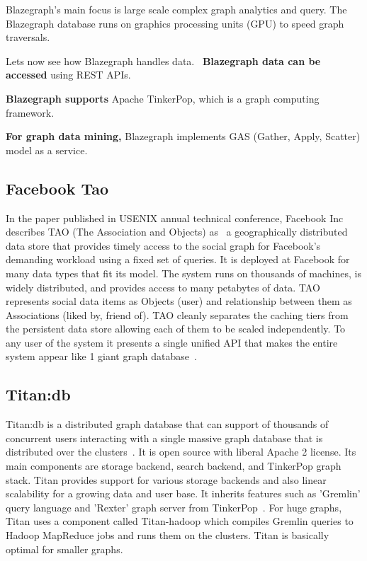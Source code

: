      Blazegraph's main focus is large scale complex graph analytics
     and query.  The Blazegraph database runs on graphics processing
     units (GPU) to speed graph traversals.~\cite{paper-blzgraph}

     Lets now see how Blazegraph handles data.~\cite{www-blzgraph} 
     {\bf Blazegraph data can be accessed} using REST APIs. 

     {\bf Blazegraph supports} Apache TinkerPop, which is a graph
      computing framework.

     {\bf For graph data mining,} Blazegraph implements GAS (Gather, Apply, 
     Scatter) model as a service.

     \pv

\subsection{Facebook Tao}

In the paper published in USENIX annual technical conference, Facebook
Inc describes TAO (The Association and Objects) as~\cite{book-tao} a
geographically distributed data store that provides timely access to
the social graph for Facebook's demanding workload using a fixed set
of queries. It is deployed at Facebook for many data types that fit
its model. The system runs on thousands of machines, is widely
distributed, and provides access to many petabytes of data. TAO
represents social data items as Objects (user) and relationship
between them as Associations (liked by, friend of).  TAO cleanly
separates the caching tiers from the persistent data store allowing
each of them to be scaled independently. To any user of the system it
presents a single unified API that makes the entire system appear like
1 giant graph database~\cite{www-tao}.

     \pv

\subsection{Titan:db}

Titan:db is a distributed graph database that can support of thousands
of concurrent users interacting with a single massive graph database
that is distributed over the clusters~\cite{www-Titan}. It is open
source with liberal Apache 2 license. Its main components are storage
backend, search backend, and TinkerPop graph stack. Titan provides
support for various  storage backends and also linear scalability for
a growing data and user base. It inherits features such as 'Gremlin'
query language and 'Rexter' graph server from
TinkerPop~\cite{www-TinkerPop}.  For huge graphs, Titan uses a
component called Titan-hadoop which compiles Gremlin queries to Hadoop
MapReduce jobs and runs them on the clusters. Titan is basically
optimal for smaller graphs.

